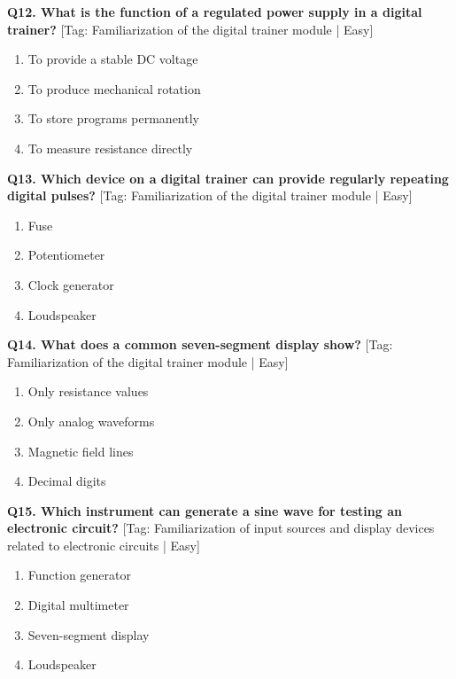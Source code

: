 \noindent\textbf{Q12. What is the function of a regulated power supply in a digital trainer?} \hfill [Tag: Familiarization of the digital trainer module | Easy]
\begin{enumerate}[label=(\alph*),topsep=2pt,itemsep=1pt,partopsep=0pt,parsep=0pt]
    \item {To provide a stable DC voltage}
    \item {To produce mechanical rotation}
    \item {To store programs permanently}
    \item {To measure resistance directly}
\end{enumerate}
\vspace{2mm}

\noindent\textbf{Q13. Which device on a digital trainer can provide regularly repeating digital pulses?} \hfill [Tag: Familiarization of the digital trainer module | Easy]
\begin{enumerate}[label=(\alph*),topsep=2pt,itemsep=1pt,partopsep=0pt,parsep=0pt]
    \item {Fuse}
    \item {Potentiometer}
    \item {Clock generator}
    \item {Loudspeaker}
\end{enumerate}
\vspace{2mm}

\noindent\textbf{Q14. What does a common seven-segment display show?} \hfill [Tag: Familiarization of the digital trainer module | Easy]
\begin{enumerate}[label=(\alph*),topsep=2pt,itemsep=1pt,partopsep=0pt,parsep=0pt]
    \item {Only resistance values}
    \item {Only analog waveforms}
    \item {Magnetic field lines}
    \item {Decimal digits}
\end{enumerate}
\vspace{2mm}

\noindent\textbf{Q15. Which instrument can generate a sine wave for testing an electronic circuit?} \hfill [Tag: Familiarization of input sources and display devices related to electronic circuits | Easy]
\begin{enumerate}[label=(\alph*),topsep=2pt,itemsep=1pt,partopsep=0pt,parsep=0pt]
    \item {Function generator}
    \item {Digital multimeter}
    \item {Seven-segment display}
    \item {Loudspeaker}
\end{enumerate}
\vspace{2mm}

